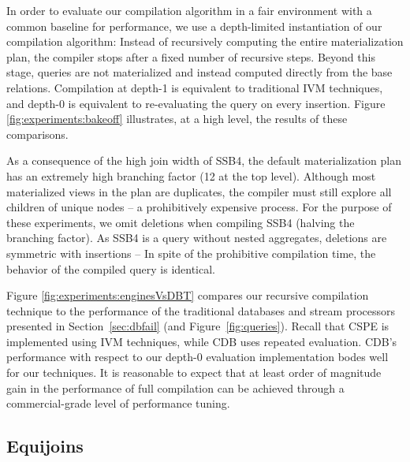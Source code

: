 
In order to evaluate our compilation algorithm in a fair environment with a common baseline for performance, we use a depth-limited instantiation of our compilation algorithm: Instead of recursively computing the entire materialization plan, the compiler stops after a fixed number of recursive steps.  Beyond this stage, queries are not materialized and instead computed directly from the base relations.   Compilation at depth-1 is equivalent to traditional IVM techniques, and depth-0 is equivalent to re-evaluating the query on every insertion.  Figure \ref{fig:experiments:bakeoff} illustrates, at a high level, the results of these comparisons.

As a consequence of the high join width of SSB4, the default materialization plan has an extremely high branching factor (12 at the top level).  Although most materialized views in the plan are duplicates, the compiler must still explore all children of unique nodes -- a prohibitively expensive process.  For the purpose of these experiments, we omit deletions when compiling SSB4 (halving the branching factor).  As SSB4 is a query without nested aggregates, deletions are symmetric with insertions -- In spite of the prohibitive compilation time, the behavior of the compiled query is identical.

Figure \ref{fig:experiments:enginesVsDBT} compares our recursive compilation technique to the performance of the traditional databases and stream processors presented in Section~\ref{sec:dbfail} (and Figure~\ref{fig:queries}).  Recall that CSPE is implemented using IVM techniques, while CDB uses repeated evaluation.  CDB's performance with respect to our depth-0 evaluation implementation bodes well for our techniques.  It is reasonable to expect that at least order of magnitude gain in the performance of full compilation can be achieved through a commercial-grade level of performance tuning.

\subsection{Equijoins}

